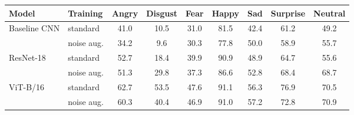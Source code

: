 \begin{tabular}{llccccccc}
\toprule
Model & Training & Angry & Disgust & Fear & Happy & Sad & Surprise & Neutral \\
\midrule
Baseline CNN & standard & 41.0 & 10.5 & 31.0 & 81.5 & 42.4 & 61.2 & 49.2 \\
 & noise aug. & 34.2 & 9.6 & 30.3 & 77.8 & 50.0 & 58.9 & 55.7 \\
\addlinespace
ResNet-18 & standard & 52.7 & 18.4 & 39.9 & 90.9 & 48.9 & 64.7 & 55.6 \\
 & noise aug. & 51.3 & 29.8 & 37.3 & 86.6 & 52.8 & 68.4 & 68.7 \\
\addlinespace
ViT-B/16 & standard & 62.7 & 53.5 & 47.6 & 91.1 & 56.3 & 76.9 & 70.5 \\
 & noise aug. & 60.3 & 40.4 & 46.9 & 91.0 & 57.2 & 72.8 & 70.9 \\
\bottomrule
\end{tabular}
